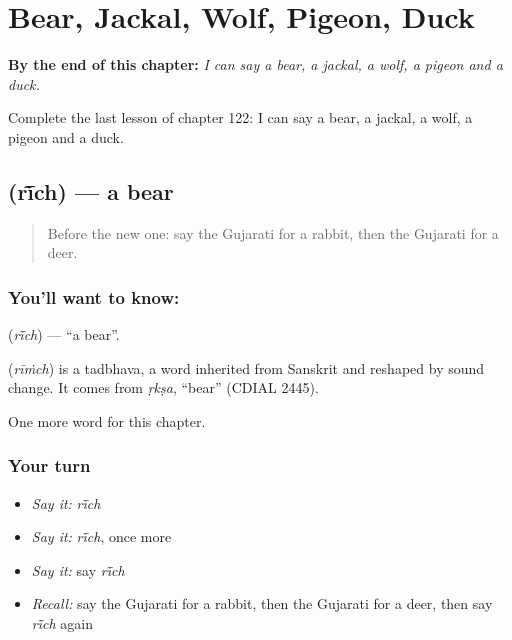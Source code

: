 
\chapter{Bear, Jackal, Wolf, Pigeon, Duck}
\label{ch:gu-bear-jackal-wolf-pigeon-duck}

\begin{chapteropening}
\textbf{By the end of this chapter:} \emph{I can say a bear, a jackal, a wolf, a pigeon and a duck.}

Complete the last lesson of chapter 122: I can say a bear, a jackal, a wolf, a pigeon and a duck.
\end{chapteropening}

\section[\texorpdfstring{\gu{રીંછ} (rī̃ch)}{રીંછ (rī̃ch)}]{ (rī̃ch) — a bear}

\label{lesson:GU-C122-rich}



\begin{quote}
Before the new one: say the Gujarati for a rabbit, then the Gujarati for a deer.
\end{quote}

\subsection*{You'll want to know: }
\textbf{} (\emph{rī̃ch}) — \textquotedblleft{}a bear\textquotedblright{}.

\begin{cousinweb}
\textbf{} (\emph{rīṁch}) is a tadbhava, a word inherited from Sanskrit and reshaped by sound change. It comes from \emph{ṛkṣa}, \textquotedblleft{}bear\textquotedblright{} (CDIAL 2445).
\end{cousinweb}

\begin{grammarlens}[title={What you've built}]
One more word for this chapter.
\end{grammarlens}

\subsection*{Your turn}
\begin{itemize}
\raggedright
  \item \emph{Say it:} \emph{rī̃ch}
  \item \emph{Say it:} \emph{rī̃ch}, once more
  \item \emph{Say it:} say \emph{rī̃ch}
  \item \emph{Recall:} say the Gujarati for a rabbit, then the Gujarati for a deer, then say \emph{rī̃ch} again
\end{itemize}

